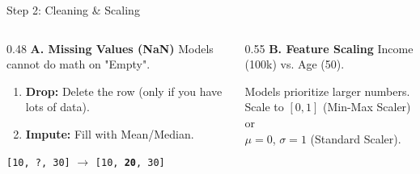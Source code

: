 \begin{frame}{Step 2: Cleaning \& Scaling}

    \begin{columns}[T]
        \begin{column}{0.48\textwidth}
            \textbf{A. Missing Values (NaN)}
            \small Models cannot do math on "Empty".
            \vspace{0.5em}
            \begin{tcolorbox}[colback=gray!5, colframe=gray!50, title=Strategies]
                \small
                \begin{enumerate}
                    \item \textbf{Drop:} Delete the row (only if you have lots of data).
                    \item \textbf{Impute:} Fill with Mean/Median.
                \end{enumerate}
                \vspace{0.5em}
                \centering
                \texttt{[10, ?, 30]} $\rightarrow$ \texttt{[10, \textbf{20}, 30]}
            \end{tcolorbox}
        \end{column}
        
        \begin{column}{0.55\textwidth}
            \textbf{B. Feature Scaling}
            \small Income (100k) vs. Age (50).
            \vspace{0.5em}
            \begin{tcolorbox}[colback=blue!5, colframe=blue!50, title=Why Scale?]
                \centering
                \small
                Models prioritize larger numbers. \\ Scale to $[0,1]$ (Min-Max Scaler) or \\ $\mu=0$, $\sigma=1$ (Standard Scaler).
            \end{tcolorbox}
        \end{column}
    \end{columns}
\end{frame}

